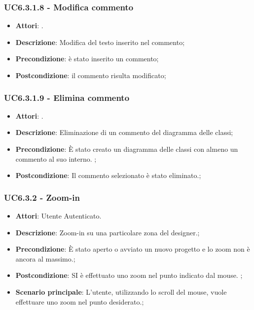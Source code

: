 \subsubsection{UC6.3.1.8 - Modifica commento} 
\label{sssec:UC6.3.1.8} 
\begin{itemize} 
\item \textbf{Attori}: .
\item \textbf{Descrizione}: Modifica del testo inserito nel commento;
\item \textbf{Precondizione}: è stato inserito un commento;
\item \textbf{Postcondizione}: il commento risulta modificato;
\end{itemize} 
\subsubsection{UC6.3.1.9 - Elimina commento} 
\label{sssec:UC6.3.1.9} 
\begin{itemize} 
\item \textbf{Attori}: .
\item \textbf{Descrizione}: Eliminazione di un commento del diagramma delle classi;
\item \textbf{Precondizione}: È stato creato un diagramma delle classi con almeno un commento al suo interno.
;
\item \textbf{Postcondizione}: Il commento selezionato è stato eliminato.;
\end{itemize} 
\subsubsection{UC6.3.2 - Zoom-in} 
\label{sssec:UC6.3.2} 
\begin{itemize} 
\item \textbf{Attori}: Utente Autenticato.
\item \textbf{Descrizione}: Zoom-in su una particolare zona del designer.;
\item \textbf{Precondizione}: È stato aperto o avviato un nuovo progetto e lo zoom non è ancora al massimo.;
\item \textbf{Postcondizione}: SI è effettuato uno zoom nel punto indicato dal mouse.
;
\item \textbf{Scenario principale}: L'utente, utilizzando lo scroll del mouse, vuole effettuare uno zoom nel punto desiderato.;\end{itemize} 
